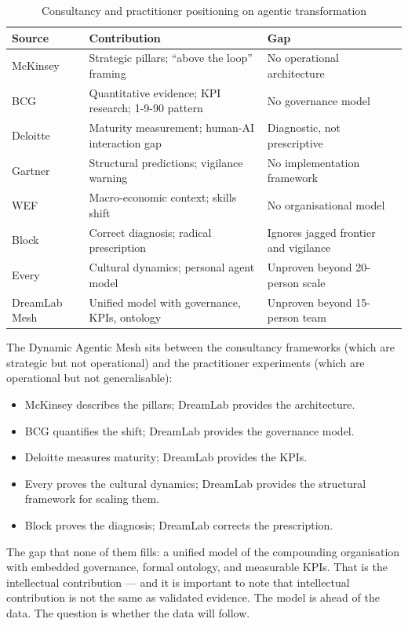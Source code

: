 \begin{table}[h]
\centering
\caption{Consultancy and practitioner positioning on agentic transformation}
\label{tab:landscape-comparison}
\begin{tabularx}{\textwidth}{l X X}
\toprule
\textbf{Source} & \textbf{Contribution} & \textbf{Gap} \\
\midrule
McKinsey & Strategic pillars; ``above the loop'' framing & No operational architecture \\
\addlinespace
BCG & Quantitative evidence; KPI research; 1-9-90 pattern & No governance model \\
\addlinespace
Deloitte & Maturity measurement; human-AI interaction gap & Diagnostic, not prescriptive \\
\addlinespace
Gartner & Structural predictions; vigilance warning & No implementation framework \\
\addlinespace
WEF & Macro-economic context; skills shift & No organisational model \\
\addlinespace
Block & Correct diagnosis; radical prescription & Ignores jagged frontier and vigilance \\
\addlinespace
Every & Cultural dynamics; personal agent model & Unproven beyond 20-person scale \\
\addlinespace
DreamLab Mesh & Unified model with governance, KPIs, ontology & Unproven beyond 15-person team \\
\bottomrule
\end{tabularx}
\end{table}

\begin{keyinsight}[title={The Positioning Opportunity}]
The Dynamic Agentic Mesh sits between the consultancy frameworks (which are strategic but not operational) and the practitioner experiments (which are operational but not generalisable):
\begin{itemize}
  \item McKinsey describes the pillars; DreamLab provides the architecture.
  \item BCG quantifies the shift; DreamLab provides the governance model.
  \item Deloitte measures maturity; DreamLab provides the KPIs.
  \item Every proves the cultural dynamics; DreamLab provides the structural framework for scaling them.
  \item Block proves the diagnosis; DreamLab corrects the prescription.
\end{itemize}

The gap that none of them fills: a unified model of the compounding organisation with embedded governance, formal ontology, and measurable KPIs. That is the intellectual contribution --- and it is important to note that intellectual contribution is not the same as validated evidence. The model is ahead of the data. The question is whether the data will follow.
\end{keyinsight}
